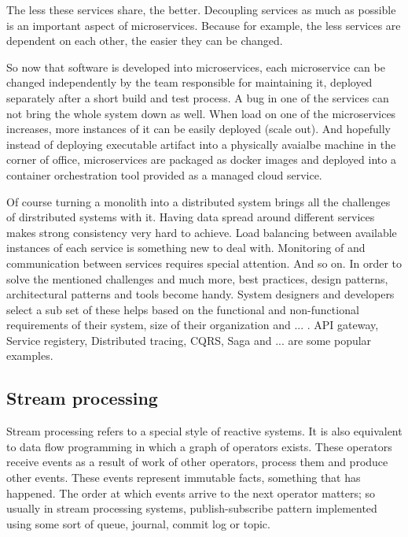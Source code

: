 \documentclass[a4]{report}
\begin{document}
        The less these services share, the better.
        Decoupling services as much as possible is an important aspect of microservices.
        Because for example, the less services are dependent on each other, the easier they can be changed.

        So now that software is developed into microservices, each microservice can be changed independently by the
        team responsible for maintaining it, deployed separately after a short build and test process.
        A bug in one of the services can not bring the whole system down as well.
        When load on one of the microservices increases, more instances of it can be easily deployed (scale out).
        And hopefully instead of deploying executable artifact into a physically avaialbe machine in the corner of
        office, microservices are packaged as docker images and deployed into a container orchestration tool provided as
        a managed cloud service.

        Of course turning a monolith into a distributed system brings all the challenges of dirstributed systems with it.
        Having data spread around different services makes strong consistency very hard to achieve.
        Load balancing between available instances of each service is something new to deal with.
        Monitoring of and communication between services requires special attention.
        And so on.
        In order to solve the mentioned challenges and much more, best practices, design patterns, architectural patterns
        and tools become handy.
        System designers and developers select a sub set of these helps based on the functional and non-functional
        requirements of their system, size of their organization and ... .
        API gateway, Service registery, Distributed tracing, CQRS, Saga and ... are some popular examples.

        \subsection{Stream processing \cite{flink} \cite{fast-data-archs}}
        Stream processing refers to a special style of reactive systems.
        It is also equivalent to data flow programming in which a graph of operators exists.
        These operators receive events as a result of work of other operators, process them and produce other events.
        These events represent immutable facts, something that has happened.
        The order at which events arrive to the next operator matters; so usually in stream processing systems,
        publish-subscribe pattern implemented using some sort of queue, journal, commit log or topic.
\end{document}
